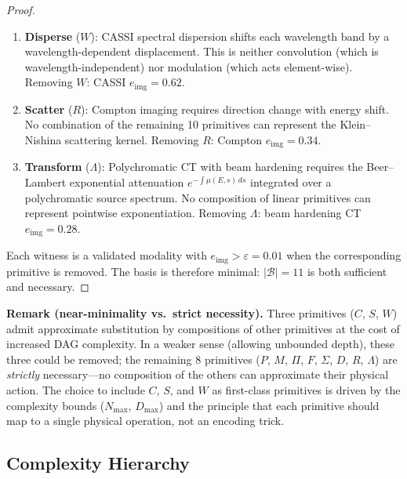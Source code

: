 \documentclass[11pt]{article}
\begin{document}
\begin{proof}
\begin{enumerate}
    set $\Omega \subsetneq \{1,\ldots,n\}$.  While $M$ with a binary mask
    achieves the same effect in the spatial domain, $S$ operates in $k$-space
    on non-uniform grids where $M$ is not defined without first applying $F^{-1}$.
    Removing $S$: accelerated MRI $e_{\mathrm{img}} = 0.15$.
  \item \textbf{Disperse} ($W$): CASSI spectral dispersion shifts each wavelength
    band by a wavelength-dependent displacement.  This is neither convolution
    (which is wavelength-independent) nor modulation (which acts element-wise).
    Removing $W$: CASSI $e_{\mathrm{img}} = 0.62$.
  \item \textbf{Scatter} ($R$): Compton imaging requires direction change with
    energy shift.  No combination of the remaining 10 primitives can
    represent the Klein--Nishina scattering kernel.
    Removing $R$: Compton $e_{\mathrm{img}} = 0.34$.
  \item \textbf{Transform} ($\Lambda$): Polychromatic CT with beam hardening
    requires the Beer--Lambert exponential attenuation $e^{-\int \mu(E,s)\,ds}$
    integrated over a polychromatic source spectrum.  No composition of linear
    primitives can represent pointwise exponentiation.
    Removing $\Lambda$: beam hardening CT $e_{\mathrm{img}} = 0.28$.
\end{enumerate}

\noindent Each witness is a validated modality with $e_{\mathrm{img}} > \varepsilon = 0.01$ when the corresponding primitive is removed. The basis is therefore minimal: $|\mathcal{B}| = 11$ is both sufficient and necessary.
\end{proof}

\noindent\textbf{Remark (near-minimality vs.\ strict necessity).}
Three primitives ($C$, $S$, $W$) admit approximate substitution by compositions of other primitives at the cost of increased DAG complexity. In a weaker sense (allowing unbounded depth), these three could be removed; the remaining 8 primitives ($P$, $M$, $\Pi$, $F$, $\Sigma$, $D$, $R$, $\Lambda$) are \emph{strictly} necessary---no composition of the others can approximate their physical action. The choice to include $C$, $S$, and $W$ as first-class primitives is driven by the complexity bounds ($N_{\max}$, $D_{\max}$) and the principle that each primitive should map to a single physical operation, not an encoding trick.

\subsection{Complexity Hierarchy}
\label{sec:complexity}
\end{document}
